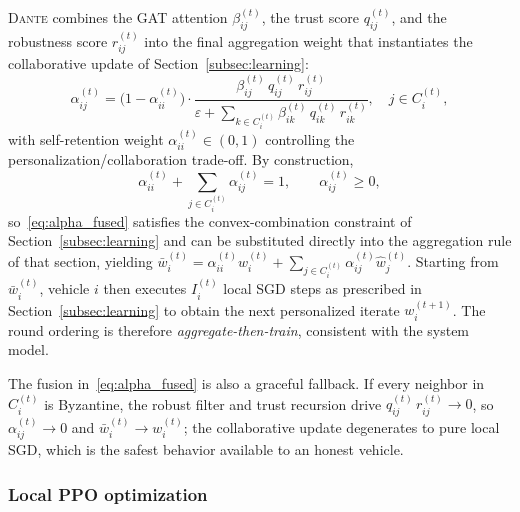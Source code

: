 \textsc{Dante} combines the GAT attention $\beta_{ij}^{(t)}$, the trust score $q_{ij}^{(t)}$, and the robustness score $r_{ij}^{(t)}$ into the final aggregation weight that instantiates the collaborative update of Section~\ref{subsec:learning}:
\begin{equation}
\label{eq:alpha_fused}
    \alpha_{ij}^{(t)} = \bigl(1-\alpha_{ii}^{(t)}\bigr)\cdot\frac{\beta_{ij}^{(t)}\,q_{ij}^{(t)}\,r_{ij}^{(t)}}{\varepsilon+\displaystyle\sum_{k\in C_i^{(t)}}\beta_{ik}^{(t)}\,q_{ik}^{(t)}\,r_{ik}^{(t)}},\quad j\in C_i^{(t)},
\end{equation}
with self-retention weight $\alpha_{ii}^{(t)}\in(0,1)$ controlling the personalization/collaboration trade-off. By construction,
\begin{equation*}
    \alpha_{ii}^{(t)}+\sum_{j\in C_i^{(t)}}\alpha_{ij}^{(t)} = 1,\qquad \alpha_{ij}^{(t)}\ge 0,
\end{equation*}
so~\eqref{eq:alpha_fused} satisfies the convex-combination constraint of Section~\ref{subsec:learning} and can be substituted directly into the aggregation rule of that section, yielding $\bar w_i^{(t)}=\alpha_{ii}^{(t)}w_i^{(t)}+\sum_{j\in C_i^{(t)}}\alpha_{ij}^{(t)}\hat w_j^{(t)}$. Starting from $\bar w_i^{(t)}$, vehicle $i$ then executes $I_i^{(t)}$ local SGD steps as prescribed in Section~\ref{subsec:learning} to obtain the next personalized iterate $w_i^{(t+1)}$. The round ordering is therefore \emph{aggregate-then-train}, consistent with the system model.

The fusion in~\eqref{eq:alpha_fused} is also a graceful fallback. If every neighbor in $C_i^{(t)}$ is Byzantine, the robust filter and trust recursion drive $q_{ij}^{(t)}\,r_{ij}^{(t)}\!\to\! 0$, so $\alpha_{ij}^{(t)}\!\to\! 0$ and $\bar w_i^{(t)}\!\to\! w_i^{(t)}$; the collaborative update degenerates to pure local SGD, which is the safest behavior available to an honest vehicle.

\subsubsection{Local PPO optimization}
\label{subsubsec:ppo}

